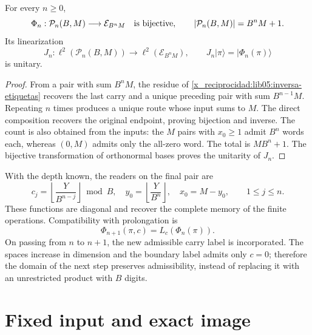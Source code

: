 \begin{theorem}
\label{x_reciprocidad:lib05:teo-rutas}
For every \(n\geq0\),
\begin{equation}
 \Phi_n:\mathcal P_n(B,M)\longrightarrow\mathcal E_{B^nM}
 \quad\hbox{is bijective},\qquad
 |\mathcal P_n(B,M)|=B^nM+1.
 \label{x_reciprocidad:lib05:biyeccion-rutas}
\end{equation}
Its linearization
\begin{equation}
 J_n:\ell^2(\mathcal P_n(B,M))\longrightarrow
          \ell^2(\mathcal E_{B^nM}),\qquad
 J_n|\pi\rangle=|\Phi_n(\pi)\rangle
 \label{x_reciprocidad:lib05:jn}
\end{equation}
is unitary.
\end{theorem}

\begin{proof}
From a pair with sum \(B^nM\), the residue of
\eqref{x_reciprocidad:lib05:inversa-etiquetas} recovers the last carry and a
unique preceding pair with sum \(B^{n-1}M\). Repeating \(n\) times
produces a unique route whose input sums to \(M\). The direct
composition recovers the original endpoint, proving bijection and
inverse. The count is also obtained from the inputs: the
\(M\) pairs with \(x_0\geq1\) admit \(B^n\) words each,
whereas \((0,M)\) admits only the all-zero
word. The total is \(MB^n+1\). The bijective transformation of
orthonormal bases proves the unitarity of \(J_n\).
\end{proof}

With the depth known, the readers on the final pair are
\begin{equation}
 c_j=\left\lfloor\frac{Y}{B^{n-j}}\right\rfloor\bmod B,
 \quad y_0=\left\lfloor\frac{Y}{B^n}\right\rfloor,
 \quad x_0=M-y_0,
 \qquad 1\leq j\leq n.
 \label{x_reciprocidad:lib05:lectores-ruta}
\end{equation}
These functions are diagonal and recover the complete memory of
the finite operations. Compatibility with prolongation is
\begin{equation}
 \Phi_{n+1}(\pi,c)=L_c(\Phi_n(\pi)).
 \label{x_reciprocidad:lib05:compatibilidad-prolongacion}
\end{equation}
On passing from \(n\) to \(n+1\), the new admissible carry
label is incorporated. The spaces increase in dimension and the
boundary label admits only \(c=0\); therefore the domain of the
next step preserves admissibility, instead of replacing it
with an unrestricted product with \(B\) digits.

\section{Fixed input and exact image}
\label{x_reciprocidad:lib05:entrada-fija}

